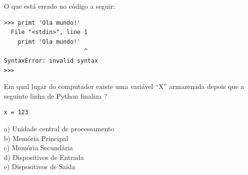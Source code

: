 \begin{ex}
O que está errado no código a seguir:

\beforeverb
\begin{verbatim}
>>> primt 'Ola mundo!'
  File "<stdin>", line 1
    primt 'Ola mundo!'
                       ^
SyntaxError: invalid syntax
>>> 
\end{verbatim}
\afterverb

\end{ex}
%
%
%

\begin{ex}
Em qual lugar do computador existe uma variável ``X'' armazenada
depois que a seguinte linha de Python finaliza ?

\beforeverb
\begin{verbatim}
x = 123
\end{verbatim}
\afterverb
%
a) Unidade central de processamento\\
b) Memória Principal\\
c) Memória Secundária\\
d) Dispositivos de Entrada\\
e) Dispositivos de Saída
\end{ex}
%
%

